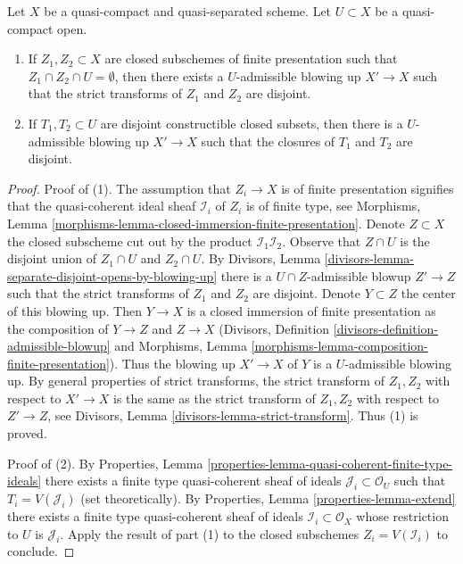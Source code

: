 \begin{lemma}
\label{lemma-separate-disjoint-locally-closed-by-blowing-up}
Let $X$ be a quasi-compact and quasi-separated scheme.
Let $U \subset X$ be a quasi-compact open.
\begin{enumerate}
\item If $Z_1, Z_2 \subset X$ are closed subschemes of finite
presentation such that $Z_1 \cap Z_2 \cap U = \emptyset$, then
there exists a $U$-admissible blowing up $X' \to X$
such that the strict transforms of $Z_1$ and $Z_2$ are disjoint.
\item If $T_1, T_2 \subset U$ are disjoint constructible closed subsets, then
there is a $U$-admissible blowing up $X' \to X$ such that the closures of
$T_1$ and $T_2$ are disjoint.
\end{enumerate}
\end{lemma}

\begin{proof}
Proof of (1). The assumption that $Z_i \to X$ is of finite presentation
signifies that the quasi-coherent ideal sheaf $\mathcal{I}_i$ of $Z_i$
is of finite type, see 
Morphisms, Lemma \ref{morphisms-lemma-closed-immersion-finite-presentation}.
Denote $Z \subset X$ the closed subscheme
cut out by the product $\mathcal{I}_1 \mathcal{I}_2$.
Observe that $Z \cap U$ is the disjoint union
of $Z_1 \cap U$ and $Z_2 \cap U$. By Divisors, Lemma
\ref{divisors-lemma-separate-disjoint-opens-by-blowing-up}
there is a $U \cap Z$-admissible blowup $Z' \to Z$ such that
the strict transforms of $Z_1$ and $Z_2$ are disjoint.
Denote $Y \subset Z$ the center of this blowing up.
Then $Y \to X$ is a closed immersion of finite presentation as the composition
of $Y \to Z$ and $Z \to X$ (Divisors, Definition
\ref{divisors-definition-admissible-blowup}
and Morphisms, Lemma \ref{morphisms-lemma-composition-finite-presentation}).
Thus the blowing up $X' \to X$ of $Y$ is a $U$-admissible blowing
up. By general properties of strict transforms, the
strict transform of $Z_1, Z_2$ with respect to $X' \to X$
is the same as the strict transform of $Z_1, Z_2$ with respect
to $Z' \to Z$, see
Divisors, Lemma \ref{divisors-lemma-strict-transform}.
Thus (1) is proved.

\medskip\noindent
Proof of (2). By Properties, Lemma
\ref{properties-lemma-quasi-coherent-finite-type-ideals}
there exists a finite type quasi-coherent sheaf of ideals
$\mathcal{J}_i \subset \mathcal{O}_U$ such that
$T_i = V(\mathcal{J}_i)$ (set theoretically).
By Properties, Lemma \ref{properties-lemma-extend}
there exists a finite type quasi-coherent sheaf
of ideals $\mathcal{I}_i \subset \mathcal{O}_X$
whose restriction to $U$ is $\mathcal{J}_i$.
Apply the result of part (1) to the closed
subschemes $Z_i = V(\mathcal{I}_i)$ to conclude.
\end{proof}
